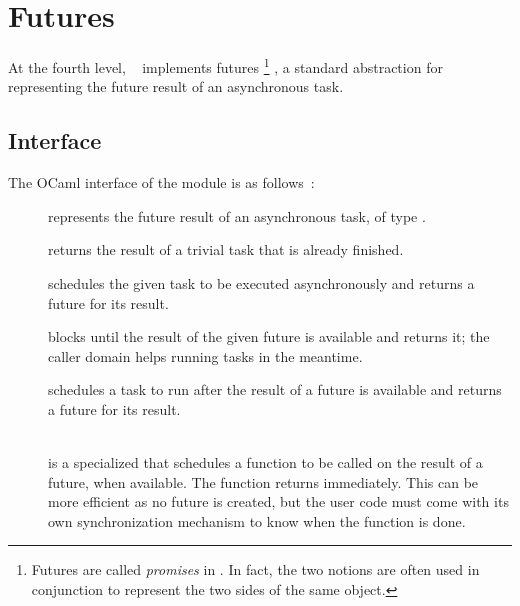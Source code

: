 \section{Futures}
\label{sec:parabs_future}

At the fourth level, ~ implements futures%
\footnote{
Futures are called \emph{promises} in \Domainslib.
In fact, the two notions are often used in conjunction to represent the two sides of the same object.
}%
, a standard abstraction for representing the future result of an asynchronous task.

\subsection{Interface}
\label{sec:parabs_future_interface}

The OCaml interface of the  module is as follows~:

\begin{description}
\item[] represents the future result of an asynchronous task,
  of type .

\item[] returns the result of
  a trivial task that is already finished.

\item[] schedules the given
  task to be executed asynchronously and returns a future for its result.

\item[] blocks
  until the result of the given future is available and returns it;
  the caller domain helps running tasks in the meantime.

\item[] schedules a task to run after the result of
  a future is available and returns a future for its result.

\item[]~\\
  is a specialized  that schedules
  a  function to be called on the result of
  a future, when available. The function returns immediately. This can
  be more efficient as no future is created, but the user code must
  come with its own synchronization mechanism to know when the
  function is done.
\end{description}


